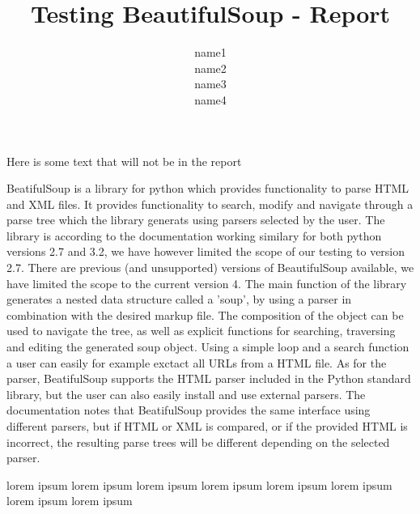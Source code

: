 \documentclass[10pt]{article}
\title{Testing BeautifulSoup - Report}
\author{name1 \\ name2 \\ name3 \\ name4}
\begin{document}
\maketitle

Here is some text that will not be in the report \\

\begin{Description of BeautifulSoup4}
 BeatifulSoup is a library for python which provides functionality to parse HTML and XML files. It provides functionality to search, modify and navigate through a parse tree which the library generats using parsers selected by the user. The library is according to the documentation working similary for both python versions 2.7 and 3.2, we have however limited the scope of our testing to version 2.7. There are previous (and unsupported) versions of BeautifulSoup available, we have limited the scope to the current version 4. The main function of the library generates a nested data structure called a 'soup', by using a parser in combination with the desired markup file. The composition of the object can be used to navigate the tree, as well as explicit functions for searching, traversing and editing the generated soup object. Using a simple loop and a search function a user can easily for example exctact all URLs from a HTML file.
As for the parser, BeatifulSoup supports the HTML parser included in the Python standard library, but the user can also easily install and use external parsers. The documentation notes that BeatifulSoup provides the same interface using different parsers, but if HTML or XML is compared, or if the provided HTML is incorrect, the resulting parse trees will be different depending on the selected parser.
\end{Description of BeautifulSoup4}

lorem ipsum lorem ipsum lorem ipsum lorem ipsum lorem ipsum lorem ipsum lorem ipsum lorem ipsum
\end{document}

